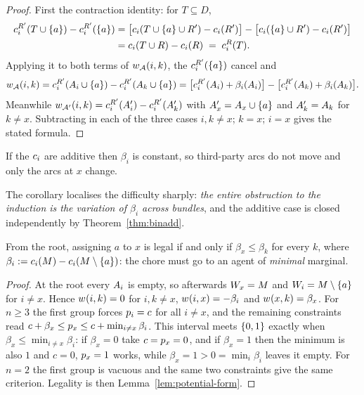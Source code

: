 \begin{proof}
First the contraction identity: for $T \subseteq D$,
\begin{align*}
  c^{R'}_i(T \cup \left\{a\right\}) - c^{R'}_i(\left\{a\right\})
  &= \big[c_i(T \cup \left\{a\right\} \cup R') - c_i(R')\big]
   - \big[c_i(\left\{a\right\} \cup R') - c_i(R')\big] \\
  &= c_i(T \cup R) - c_i(R) \;=\; c^{R}_i(T).
\end{align*}
Applying it to both terms of $w_{\mathcal{A}}(i,k)$, the
$c^{R'}_i(\left\{a\right\})$ cancel and
\[
  w_{\mathcal{A}}(i,k) = c^{R'}_i(A_{i} \cup \left\{a\right\})
  - c^{R'}_i(A_{k} \cup \left\{a\right\})
  = \big[c^{R'}_i(A_{i}) + \beta_i(A_{i})\big]
  - \big[c^{R'}_i(A_{k}) + \beta_i(A_{k})\big].
\]
Meanwhile $w_{\mathcal{A}'}(i,k) = c^{R'}_i(A_{i}') -
c^{R'}_i(A_{k}')$ with $A_{x}' = A_{x} \cup \left\{a\right\}$ and
$A_{k}' = A_{k}$ for $k \ne x$. Subtracting in each of the three cases
$i,k \ne x$; $k = x$; $i = x$ gives the stated formula.
\end{proof}

\begin{corollary}
\label{cor:cri-additive}
If the $c_i$ are additive then $\beta_i$ is constant, so third-party arcs do
not move and only the arcs at $x$ change.
\end{corollary}

The corollary localises the difficulty sharply: \emph{the entire obstruction to
the induction is the variation of $\beta_i$ across bundles}, and the additive
case is closed independently by Theorem~\ref{thm:binadd}.

\begin{proposition}
\label{prop:cri-first}
From the root, assigning $a$ to $x$ is legal if and only if
$\beta_x \le \beta_k$ for every $k$, where
$\beta_i := c_i(M) - c_i(M \setminus \left\{a\right\})$: the chore must
go to an agent of \emph{minimal} marginal.
\end{proposition}

\begin{proof}
At the root every $A_{i}$ is empty, so afterwards $W_x = M$
and $W_i = M \setminus \left\{a\right\}$ for $i \ne x$. Hence
$w_{}(i,k) = 0$ for $i,k \ne x$, $w_{}(i,x) = -\beta_i$ and
$w_{}(x,k) = \beta_x$. For $n \ge 3$ the first group forces $p_i = c$
for all $i \ne x$, and the remaining constraints read
$c + \beta_x \le p_x \le c + \min_{i \ne x}\beta_i$. This interval meets
$\left\{0,1\right\}$ exactly when $\beta_x \le \min_{i \ne x}\beta_i$: if $\beta_x = 0$
take $c = p_x = 0$, and if $\beta_x = 1$ then the minimum is also $1$ and
$c = 0$, $p_x = 1$ works, while $\beta_x = 1 > 0 = \min_i \beta_i$ leaves
it empty. For $n = 2$ the first group is vacuous and the same two constraints
give the same criterion. Legality is then Lemma~\ref{lem:potential-form}.
\end{proof}

